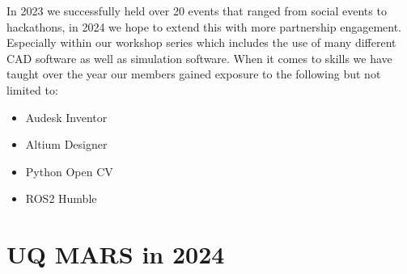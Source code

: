 \documentclass[a4paper,12pt]{report}
\begin{document}
In 2023 we successfully held over 20 events that ranged from social events to hackathons, in 2024 we hope to extend this with more partnership engagement. Especially within our workshop series which includes the use of many different CAD software as well as simulation software. When it comes to skills we have taught over the year our members gained exposure to the following but not limited to:
\begin{itemize}
    \item Audesk Inventor
    \item Altium Designer
    \item Python Open CV
    \item ROS2 Humble
\end{itemize}

\newpage

\section*{UQ MARS in 2024}
\end{document}
